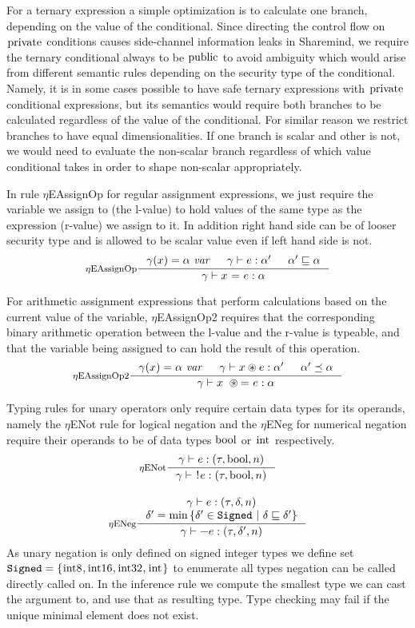 \documentclass[a4paper, 10pt, draft]{report}
\newcommand{\mycode}[1]{\ensuremath{\mbox{\lstinline{#1}}}}
\begin{document}
For a ternary expression a simple optimization is to calculate one branch,
depending on the value of the conditional. Since directing the control flow on
\mycode{private} conditions causes side-channel information leaks in Sharemind,
we require the ternary conditional always to be \mycode{public} to avoid
ambiguity which would arise from different semantic rules depending on the
security type of the conditional. Namely, it is in some cases possible to have
safe ternary expressions with \mycode{private} conditional expressions, but its
semantics would require both branches to be calculated regardless of the value
of the conditional. For similar reason we restrict branches to have equal
dimensionalities. If one branch is scalar and other is not, we would need to
evaluate the non-scalar branch regardless of which value conditional takes in
order to shape non-scalar appropriately.

In rule $\eta$EAssignOp for regular assignment expressions, we just require the
variable we assign to (the l-value) to hold values of the same type as the
expression (r-value) we assign to it. In addition right hand side can be of
looser security type and is allowed to be scalar value even if left hand side
is not.
\[ \inference[$\eta$EAssignOp]
{
  \gamma(x) = \alpha\ \mathit{var} &
  \gamma |- e : \alpha' &
  \alpha' \sqsubseteq \alpha
}
{
  \gamma |- x\ \mycode{=}\ e : \alpha
} \]

For arithmetic assignment expressions that perform calculations based on the
current value of the variable, $\eta$EAssignOp2 requires that the corresponding
binary arithmetic operation between the l-value and the r-value is typeable,
and that the variable being assigned to can hold the result of this operation.
\[ \inference[$\eta$EAssignOp2]
{
  \gamma(x) = \alpha\ \mathit{var} &
  \gamma |- x \circledast e : \alpha' &
  \alpha' \preceq \alpha
}
{
  \gamma |- x\  \circledast \mycode{=}\ e : \alpha
} \]

Typing rules for unary operators only require certain data types for its
operands, namely the $\eta$ENot rule for logical negation and the $\eta$ENeg
for numerical negation require their operands to be of data types \mycode{bool}
or \mycode{int} respectively.
\[\begin{array}{c}
\inference[$\eta$ENot]{\gamma |- e : (\tau, \mycode{bool}, n)}{\gamma |- \mycode{!}e : (\tau, \mycode{bool}, n)} \\[2em]

\inference[$\eta$ENeg]{
  \gamma |- e : (\tau, \delta, n) \\
  \delta' = \min \left\{ \delta'\in\mathtt{Signed}\ |\ \delta \sqsubseteq \delta' \right\}
}{
  \gamma |- \mycode{-}e : (\tau, \delta', n)
}
\end{array} \]
As unary negation is only defined on signed integer types we define set
$\mathtt{Signed} = \left\{ \mycode{int8}, \mycode{int16}, \mycode{int32}, \mycode{int} \right\}$ to enumerate all
types negation can be called directly called on. In the inference rule we
compute the smallest type we can cast the argument to, and use that as
resulting type. Type checking may fail if the unique minimal element does not
exist.
\end{document}
